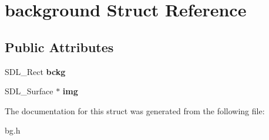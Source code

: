 \hypertarget{structbackground}{}\section{background Struct Reference}
\label{structbackground}
\subsection*{Public Attributes}
\begin{DoxyCompactItemize}
\item 
S\+D\+L\+\_\+\+Rect {\bfseries bckg}\hypertarget{structbackground_a6cd0518c8d8a98207f008f55de18de1d}{}\label{structbackground_a6cd0518c8d8a98207f008f55de18de1d}

\item 
S\+D\+L\+\_\+\+Surface $\ast$ {\bfseries img}\hypertarget{structbackground_a1c5c3a3ebb56924b9f829602f9641006}{}\label{structbackground_a1c5c3a3ebb56924b9f829602f9641006}

\end{DoxyCompactItemize}


The documentation for this struct was generated from the following file\+:\begin{DoxyCompactItemize}
\item 
bg.\+h\end{DoxyCompactItemize}
